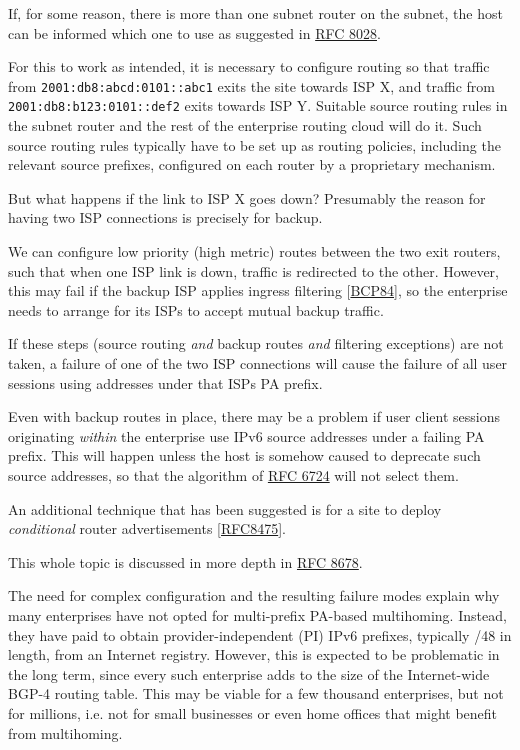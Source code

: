 \documentclass[
]{article}
\begin{document}
If, for some reason, there is more than one subnet router on the subnet,
the host can be informed which one to use as suggested in
\href{https://www.rfc-editor.org/info/rfc8028}{RFC 8028}.

For this to work as intended, it is necessary to configure routing so
that traffic from \texttt{2001:db8:abcd:0101::abc1} exits the site
towards ISP X, and traffic from \texttt{2001:db8:b123:0101::def2} exits
towards ISP Y. Suitable source routing rules in the subnet router and
the rest of the enterprise routing cloud will do it. Such source routing
rules typically have to be set up as routing policies, including the
relevant source prefixes, configured on each router by a proprietary
mechanism.

But what happens if the link to ISP X goes down? Presumably the reason
for having two ISP connections is precisely for backup.

We can configure low priority (high metric) routes between the two exit
routers, such that when one ISP link is down, traffic is redirected to
the other. However, this may fail if the backup ISP applies ingress
filtering {[}\href{https://www.rfc-editor.org/info/bcp84}{BCP84}{]}, so
the enterprise needs to arrange for its ISPs to accept mutual backup
traffic.

If these steps (source routing \emph{and} backup routes \emph{and}
filtering exceptions) are not taken, a failure of one of the two ISP
connections will cause the failure of all user sessions using addresses
under that ISP\textquotesingle s PA prefix.

Even with backup routes in place, there may be a problem if user client
sessions originating \emph{within} the enterprise use IPv6 source
addresses under a failing PA prefix. This will happen unless the host is
somehow caused to deprecate such source addresses, so that the algorithm
of \href{https://www.rfc-editor.org/info/rfc6724}{RFC 6724} will not
select them.

An additional technique that has been suggested is for a site to deploy
\emph{conditional} router advertisements
{[}\href{https://www.rfc-editor.org/info/rfc8475}{RFC8475}{]}.

This whole topic is discussed in more depth in
\href{https://www.rfc-editor.org/info/rfc8678}{RFC 8678}.

The need for complex configuration and the resulting failure modes
explain why many enterprises have not opted for multi-prefix PA-based
multihoming. Instead, they have paid to obtain provider-independent (PI)
IPv6 prefixes, typically /48 in length, from an Internet registry.
However, this is expected to be problematic in the long term, since
every such enterprise adds to the size of the Internet-wide BGP-4
routing table. This may be viable for a few thousand enterprises, but
not for millions, i.e. not for small businesses or even home offices
that might benefit from multihoming.
\end{document}
